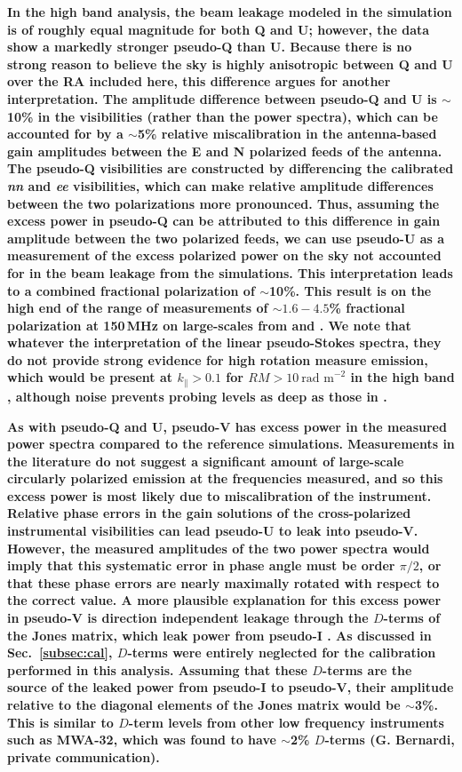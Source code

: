 \documentclass[twocolumn, trackchanges]{aastex61}
\newcommand{\edited}[1]{{\bf \color{blue} #1}}
\begin{document}
\edited{In the high band analysis, the beam leakage modeled in the simulation is
  of roughly equal magnitude for both Q and U; however, the data show a markedly
  stronger pseudo-Q than U. Because there is no strong reason to believe the sky
  is highly anisotropic between Q and U over the RA included here, this
  difference argues for another interpretation. The amplitude difference between
  pseudo-Q and U is $\sim$10\% in the visibilities (rather than the power
  spectra), which can be accounted for by a $\sim$5\% relative 
  miscalibration in the antenna-based gain amplitudes between the E and N polarized feeds of the antenna. The
  pseudo-Q visibilities are constructed by differencing the calibrated
  \textit{nn} and \textit{ee} visibilities, which can make relative amplitude
  differences between the two polarizations more pronounced. Thus, assuming the
  excess power in pseudo-Q can be attributed to this difference in gain
  amplitude between the two polarized feeds, we can use pseudo-U as a
  measurement of the excess polarized power on the sky not accounted for in the
  beam leakage from the simulations. This interpretation leads to a combined
  fractional polarization of $\sim$10\%. This result is on the high end of the
  range of measurements of $\sim 1.6 - 4.5$\% fractional polarization at
  150\,MHz on large-scales from \cite{Jelic.15} and \cite{Lenc.16}.  We note
  that whatever the interpretation of the linear pseudo-Stokes spectra, they do
  not provide strong evidence for high rotation measure emission, which would be
  present at $k_\parallel > 0.1$ for $RM > 10~\text{rad m}^{-2}$ in the high
  band \citep{Moore17}, although noise prevents probing levels as deep as those
  in \cite{Asad18}.}

\edited{As with pseudo-Q and U, pseudo-V has excess power in the measured power
  spectra compared to the reference simulations. Measurements in the literature
  do not suggest a significant amount of large-scale circularly polarized
  emission at the frequencies measured, and so this excess power is most likely
  due to miscalibration of the instrument. Relative phase errors in the gain
  solutions of the cross-polarized instrumental visibilities can lead pseudo-U
  to leak into pseudo-V. However, the measured amplitudes of the two power
  spectra would imply that this systematic error in phase angle must be order
  $\pi/2$, or that these phase errors are nearly maximally
  rotated with respect to the correct value. A more plausible explanation for
  this excess power in pseudo-V is direction independent leakage through the
  $D$-terms of the Jones matrix, which leak power from pseudo-I \citep{TMS}. As
  discussed in Sec.~\ref{subsec:cal}, $D$-terms were entirely neglected for the
  calibration performed in this analysis. Assuming that these $D$-terms are the
  source of the leaked power from pseudo-I to pseudo-V, their amplitude relative
  to the diagonal elements of the Jones matrix would be $\sim$3\%. This is similar to
  $D$-term levels from other low frequency instruments such as MWA-32, which was
  found to have $\sim$2\% $D$-terms (G. Bernardi, private communication).}
\end{document}

